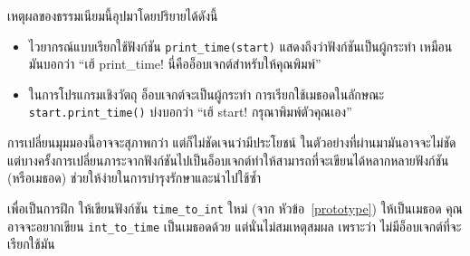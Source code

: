 เหตุผลของธรรมเนียมนี้อุปมาโดยปริยายได้ดังนี้


\begin{itemize}


\item ไวยากรณ์แบบเรียกใช้ฟังก์ชัน \verb|print_time(start)| แสดงถึงว่าฟังก์ชันเป็นผู้กระทำ เหมือนมันบอกว่า ``เฮ้ print\_time!
นี่คืออ็อบเจกต์สำหรับให้คุณพิมพ์''


\item ในการโปรแกรมเชิงวัตถุ อ็อบเจกต์จะเป็นผู้กระทำ การเรียกใช้เมธอดในลักษณะ \verb"start.print_time()" บ่งบอกว่า ``เฮ้ start!
กรุณาพิมพ์ตัวคุณเอง''

\end{itemize}


การเปลี่ยนมุมมองนี้อาจจะสุภาพกว่า แต่ก็ไม่ชัดเจนว่ามีประโยชน์ ในตัวอย่างที่ผ่านมามันอาจจะไม่ชัด  
แต่บางครั้งการเปลี่ยนภาระจากฟังก์ชันไปเป็นอ็อบเจกต์ทำให้สามารถที่จะเขียนได้หลากหลายฟังก์ชัน (หรือเมธอด) ช่วยให้ง่ายในการบำรุงรักษาและนำไปใช้ซ้ำ


เพื่อเป็นการฝึก ให้เขียนฟังก์ชัน \verb"time_to_int" ใหม่ (จาก หัวข้อ~\ref{prototype}) ให้เป็นเมธอด 
คุณอาจจะอยากเขียน \verb"int_to_time" เป็นเมธอดด้วย
แต่นั่นไม่สมเหตุสมผล เพราะว่า ไม่มีอ็อบเจกต์ที่จะเรียกใช้มัน

